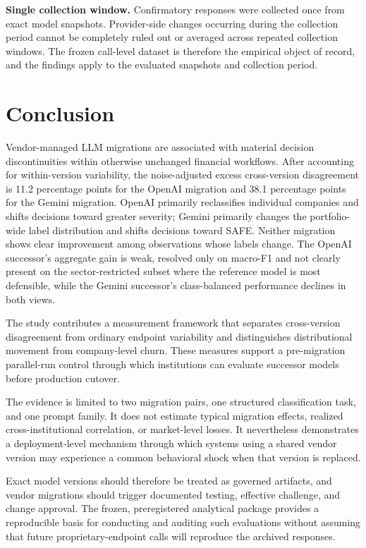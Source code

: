 \documentclass{ieeeaccess}
\begin{document}
\noindent\textbf{Single collection window.} Confirmatory responses were collected once from exact model snapshots. Provider-side changes occurring during the collection period cannot be completely ruled out or averaged across repeated collection windows. The frozen call-level dataset is therefore the empirical object of record, and the findings apply to the evaluated snapshots and collection period.

\section{Conclusion}
Vendor-managed LLM migrations are associated with material decision discontinuities within otherwise unchanged financial workflows. After accounting for within-version variability, the noise-adjusted excess cross-version disagreement is 11.2 percentage points for the OpenAI migration and 38.1 percentage points for the Gemini migration. OpenAI primarily reclassifies individual companies and shifts decisions toward greater severity; Gemini primarily changes the portfolio-wide label distribution and shifts decisions toward SAFE. Neither migration shows clear improvement among observations whose labels change. The OpenAI successor's aggregate gain is weak, resolved only on macro-F1 and not clearly present on the sector-restricted subset where the reference model is most defensible, while the Gemini successor's class-balanced performance declines in both views.

The study contributes a measurement framework that separates cross-version disagreement from ordinary endpoint variability and distinguishes distributional movement from company-level churn. These measures support a pre-migration parallel-run control through which institutions can evaluate successor models before production cutover.

The evidence is limited to two migration pairs, one structured classification task, and one prompt family. It does not estimate typical migration effects, realized cross-institutional correlation, or market-level losses. It nevertheless demonstrates a deployment-level mechanism through which systems using a shared vendor version may experience a common behavioral shock when that version is replaced.

Exact model versions should therefore be treated as governed artifacts, and vendor migrations should trigger documented testing, effective challenge, and change approval. The frozen, preregistered analytical package provides a reproducible basis for conducting and auditing such evaluations without assuming that future proprietary-endpoint calls will reproduce the archived responses.
\end{document}
